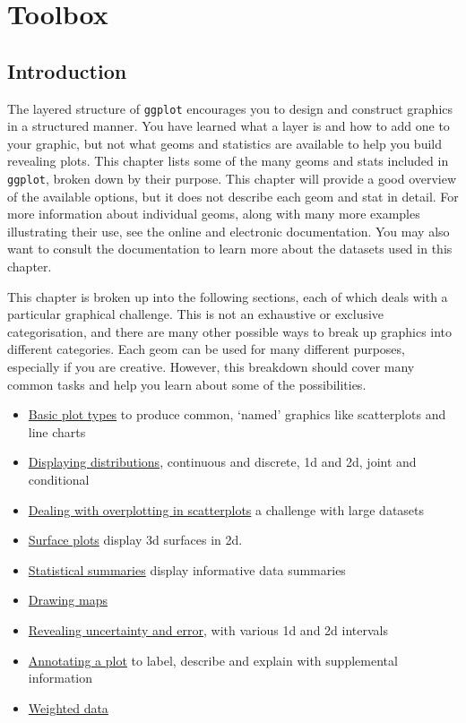 \chapter{Toolbox}\label{cha:toolbox}

\section{Introduction}

The layered structure of \texttt{ggplot} encourages you to design and
construct graphics in a structured manner. You have learned what a layer
is and how to add one to your graphic, but not what geoms and statistics
are available to help you build revealing plots. This chapter lists some
of the many geoms and stats included in \texttt{ggplot}, broken down by
their purpose. This chapter will provide a good overview of the
available options, but it does not describe each geom and stat in
detail. For more information about individual geoms, along with many
more examples illustrating their use, see the online and electronic
documentation. You may also want to consult the documentation to learn
more about the datasets used in this chapter.

This chapter is broken up into the following sections, each of which
deals with a particular graphical challenge. This is not an exhaustive
or exclusive categorisation, and there are many other possible ways to
break up graphics into different categories. Each geom can be used for
many different purposes, especially if you are creative. However, this
breakdown should cover many common tasks and help you learn about some
of the possibilities.

\begin{itemize}
\itemsep1pt\parskip0pt
\item
  \hyperref[sec:basics]{Basic plot types} to produce common, `named'
  graphics like scatterplots and line charts
\item
  \hyperref[sec:distributions]{Displaying distributions}, continuous and
  discrete, 1d and 2d, joint and conditional
\item
  \hyperref[sec:overplotting]{Dealing with overplotting in scatterplots}
  a challenge with large datasets
\item
  \hyperref[sec:surface]{Surface plots} display 3d surfaces in 2d.
\item
  \hyperref[sec:summary]{Statistical summaries} display informative data
  summaries
\item
  \hyperref[sec:maps]{Drawing maps}
\item
  \hyperref[sec:uncertainty]{Revealing uncertainty and error}, with
  various 1d and 2d intervals
\item
  \hyperref[sec:annotating]{Annotating a plot} to label, describe and
  explain with supplemental information
\item
  \hyperref[sec:weighting]{Weighted data}
\end{itemize}

